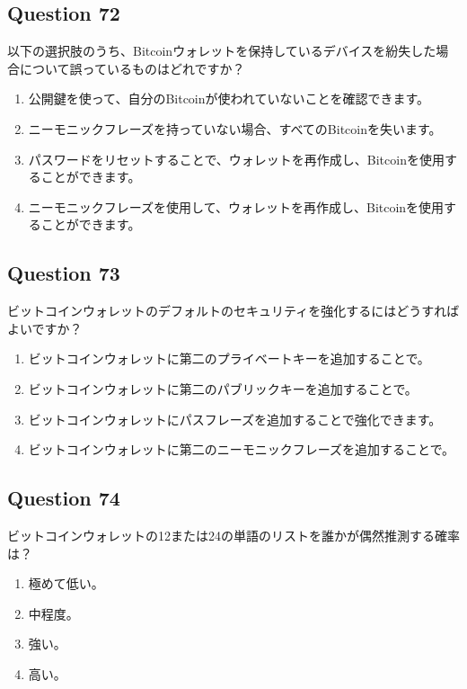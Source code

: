 \documentclass[12pt,a4paper]{article}
\begin{document}
\bigskip


\subsection*{Question 72}
以下の選択肢のうち、Bitcoinウォレットを保持しているデバイスを紛失した場合について誤っているものはどれですか？

\begin{enumerate}[label=\Alph*., leftmargin=*]
\item 公開鍵を使って、自分のBitcoinが使われていないことを確認できます。
\item ニーモニックフレーズを持っていない場合、すべてのBitcoinを失います。
\item パスワードをリセットすることで、ウォレットを再作成し、Bitcoinを使用することができます。
\item ニーモニックフレーズを使用して、ウォレットを再作成し、Bitcoinを使用することができます。
\end{enumerate}

\bigskip


\subsection*{Question 73}
ビットコインウォレットのデフォルトのセキュリティを強化するにはどうすればよいですか？

\begin{enumerate}[label=\Alph*., leftmargin=*]
\item ビットコインウォレットに第二のプライベートキーを追加することで。
\item ビットコインウォレットに第二のパブリックキーを追加することで。
\item ビットコインウォレットにパスフレーズを追加することで強化できます。
\item ビットコインウォレットに第二のニーモニックフレーズを追加することで。
\end{enumerate}

\bigskip


\subsection*{Question 74}
ビットコインウォレットの12または24の単語のリストを誰かが偶然推測する確率は？

\begin{enumerate}[label=\Alph*., leftmargin=*]
\item 極めて低い。
\item 中程度。
\item 強い。
\item 高い。
\end{enumerate}
\end{document}

